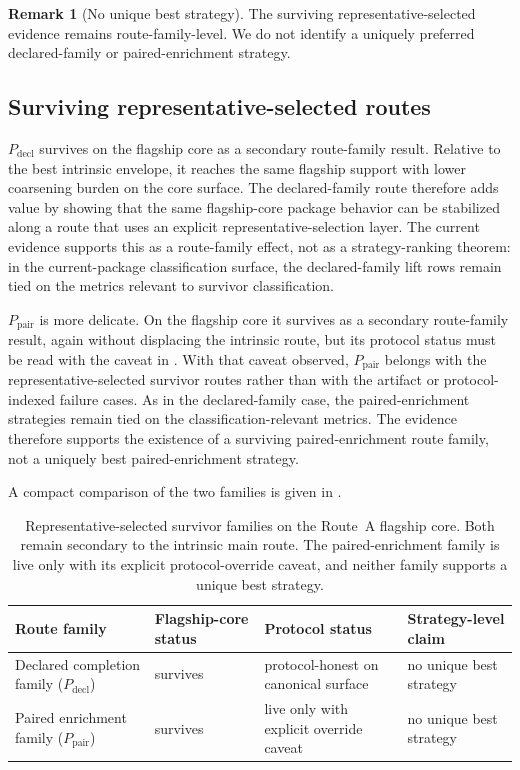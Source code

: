 \documentclass[11pt]{article}
\theoremstyle{definition}
\newtheorem{remark}[theorem]{Remark}
\begin{document}
\begin{remark}[No unique best strategy]\label{rem:no-unique-best-strategy}
The surviving representative-selected evidence remains route-family-level. We do not identify a uniquely preferred declared-family or paired-enrichment strategy.
\end{remark}

\subsection{Surviving representative-selected routes}

$P_{\mathrm{decl}}$ survives on the flagship core as a secondary route-family result. Relative to the best intrinsic envelope, it reaches the same flagship support with lower coarsening burden on the core surface. The declared-family route therefore adds value by showing that the same flagship-core package behavior can be stabilized along a route that uses an explicit representative-selection layer. The current evidence supports this as a route-family effect, not as a strategy-ranking theorem: in the current-package classification surface, the declared-family lift rows remain tied on the metrics relevant to survivor classification.

$P_{\mathrm{pair}}$ is more delicate. On the flagship core it survives as a secondary route-family result, again without displacing the intrinsic route, but its protocol status must be read with the caveat in . With that caveat observed, $P_{\mathrm{pair}}$ belongs with the representative-selected survivor routes rather than with the artifact or protocol-indexed failure cases. As in the declared-family case, the paired-enrichment strategies remain tied on the classification-relevant metrics. The evidence therefore supports the existence of a surviving paired-enrichment route family, not a uniquely best paired-enrichment strategy.

A compact comparison of the two families is given in .

\begin{table}[t]
\centering
\caption{Representative-selected survivor families on the Route~A flagship core. Both remain secondary to the intrinsic main route. The paired-enrichment family is live only with its explicit protocol-override caveat, and neither family supports a unique best strategy.}
\label{tab:lift-route-summary}
\begin{tabularx}{\linewidth}{@{}l l >{\raggedright\arraybackslash}X >{\raggedright\arraybackslash}X@{}}
\hline
Route family & Flagship-core status & Protocol status & Strategy-level claim \\
\hline
Declared completion family ($P_{\mathrm{decl}}$) & survives & protocol-honest on canonical surface & no unique best strategy \\
Paired enrichment family ($P_{\mathrm{pair}}$) & survives & live only with explicit override caveat & no unique best strategy \\
\hline
\end{tabularx}
\end{table}
\end{document}
